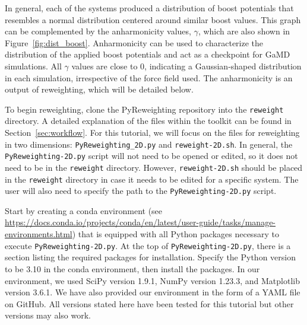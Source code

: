 \documentclass[9pt,tutorial,pubversion]{livecoms}
\begin{document}
In general, each of the systems produced a distribution of boost potentials that resembles a normal distribution centered around similar boost values. This graph can be complemented by the anharmonicity values, $\gamma$, which are also shown in Figure~\ref{fig:dist_boost}. Anharmonicity can be used to characterize the distribution of the applied boost potentials and act as a checkpoint for GaMD simulations. All $\gamma$ values are close to 0, indicating a Gaussian-shaped distribution in each simulation, irrespective of the force field used. The anharmonicity is an output of reweighting, which will be detailed below.

To begin reweighting, clone the PyReweighting repository into the \texttt{reweight} directory. A detailed explanation of the files within the toolkit can be found in Section~\ref{sec:workflow}. For this tutorial, we will focus on the files for reweighting in two dimensions: \texttt{PyReweighting\_2D.py} and \texttt{reweight-2D.sh}. In general, the \texttt{PyReweighting-2D.py} script will not need to be opened or edited, so it does not need to be in the \texttt{reweight} directory. However, \texttt{reweight-2D.sh} should be placed in the \texttt{reweight} directory in case it needs to be edited for a specific system. The user will also need to specify the path to the \texttt{PyReweighting-2D.py} script. 

Start by creating a conda environment (see \url{https://docs.conda.io/projects/conda/en/latest/user-guide/tasks/manage-environments.html}) that is equipped with all Python packages necessary to execute \texttt{PyReweighting-2D.py}. At the top of \texttt{PyReweighting-2D.py}, there is a section listing the required packages for installation. Specify the Python version to be 3.10 in the conda environment, then install the packages. In our environment, we used SciPy version 1.9.1, NumPy version 1.23.3, and Matplotlib version 3.6.1. We have also provided our environment in the form of a YAML file on GitHub. All versions stated here have been tested for this tutorial but other versions may also work. 
\end{document}
